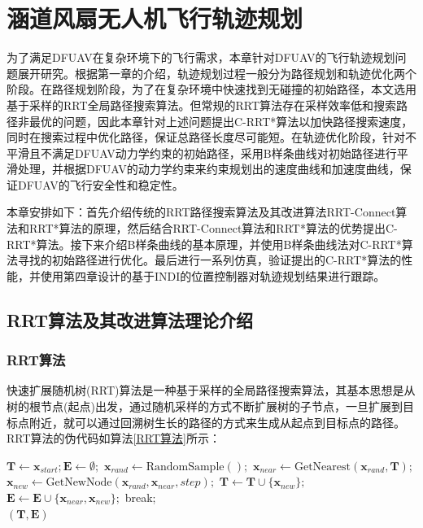 \chapter{涵道风扇无人机飞行轨迹规划}

为了满足DFUAV在复杂环境下的飞行需求，本章针对DFUAV的飞行轨迹规划问题展开研究。根据第一章的介绍，轨迹规划过程一般分为路径规划和轨迹优化两个阶段。在路径规划阶段，为了在复杂环境中快速找到无碰撞的初始路径，本文选用基于采样的RRT全局路径搜索算法。但常规的RRT算法存在采样效率低和搜索路径非最优的问题，因此本章针对上述问题提出C-RRT*算法以加快路径搜索速度，同时在搜索过程中优化路径，保证总路径长度尽可能短。在轨迹优化阶段，针对不平滑且不满足DFUAV动力学约束的初始路径，采用B样条曲线对初始路径进行平滑处理，并根据DFUAV的动力学约束来约束规划出的速度曲线和加速度曲线，保证DFUAV的飞行安全性和稳定性。

本章安排如下：首先介绍传统的RRT路径搜索算法及其改进算法RRT-Connect算法和RRT*算法的原理，然后结合RRT-Connect算法和RRT*算法的优势提出C-RRT*算法。接下来介绍B样条曲线的基本原理，并使用B样条曲线法对C-RRT*算法寻找的初始路径进行优化。最后进行一系列仿真，验证提出的C-RRT*算法的性能，并使用第四章设计的基于INDI的位置控制器对轨迹规划结果进行跟踪。

\section{RRT算法及其改进算法理论介绍}

\subsection{RRT算法}

快速扩展随机树(RRT)算法是一种基于采样的全局路径搜索算法，其基本思想是从树的根节点(起点)出发，通过随机采样的方式不断扩展树的子节点，一旦扩展到目标点附近，就可以通过回溯树生长的路径的方式来生成从起点到目标点的路径。RRT算法的伪代码如算法\ref{RRT算法}所示：
\begin{algorithm}
\caption{RRT算法}
\label{RRT算法}
\begin{algorithmic}[1]
    \setlength{\baselineskip}{16pt}
\State $\boldsymbol{T}\leftarrow\boldsymbol{x}_{start};\boldsymbol{E}\leftarrow\emptyset;$
    \State $\boldsymbol{x}_{rand} \gets \text{RandomSample}();$
    \State $\boldsymbol{x}_{near}\gets\text{GetNearest}(\boldsymbol{x}_{rand},\boldsymbol{T});$
    \State $\boldsymbol{x}_{new}\gets\text{GetNewNode}(\boldsymbol{x}_{rand},\boldsymbol{x}_{near},step);$
        \State $\boldsymbol{T}\leftarrow \boldsymbol{T}\cup\{\boldsymbol{x}_{new}\};$
        $\boldsymbol{E}\leftarrow \boldsymbol{E}\cup\{\boldsymbol{x}_{near},\boldsymbol{x}_{new}\};$
        \State break;
        \EndIf
    \EndIf
\EndWhile \\
\Return $(\boldsymbol{T},\boldsymbol{E})$
\end{algorithmic}
\end{algorithm}


